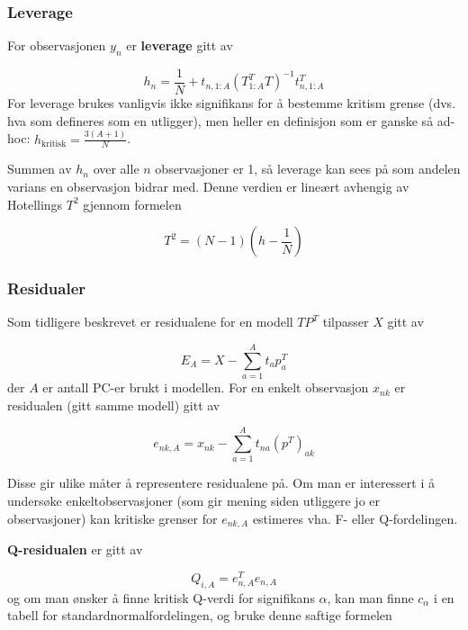 \subsubsection{Leverage}
For observasjonen $y_n$ er \textbf{leverage} gitt av

\begin{equation}
	h_n = \frac{1}{N} + t_{n, 1:A} (T_{1:A}^T T)^{-1} t_{n, 1:A}^T
\end{equation}
For leverage brukes vanligvis ikke signifikans for å bestemme kritism grense (dvs. hva som defineres som en utligger), men heller en definisjon som er ganske så ad-hoc: $h_{\textrm{kritisk}} = \frac{3(A+1)}{N}$.

Summen av $h_n$ over alle $n$ observasjoner er 1, så leverage kan sees på som andelen varians en observasjon bidrar med. Denne verdien er lineært avhengig av Hotellings $T^2$ gjennom formelen

\begin{equation}
	T^2 = (N-1) (h - \frac{1}{N})
\end{equation}

\subsubsection{Residualer}
Som tidligere beskrevet er residualene for en modell $T P^T$ tilpasser $X$ gitt av

\begin{equation}
	E_A = X - \sum_{a = 1}^A t_a p_a^T
\end{equation}
der $A$ er antall PC-er brukt i modellen. For en enkelt observasjon $x_{nk}$ er residualen (gitt samme modell) gitt av

\begin{equation}
	e_{nk, A} = x_{nk} - \sum_{a = 1}^A t_{na} (p^T)_{ak}
\end{equation}

Disse gir ulike måter å representere residualene på. Om man er interessert i å undersøke enkeltobservasjoner (som gir mening siden utliggere jo er observasjoner) kan kritiske grenser for $e_{nk, A}$ estimeres vha. F- eller Q-fordelingen. 

\textbf{Q-residualen} er gitt av

\begin{equation}
	Q_{i, A} = e_{n, A}^T e_{n, A}
\end{equation}
og om man ønsker å finne kritisk Q-verdi for signifikans $\alpha$, kan man finne $c_\alpha$ i en tabell for standardnormalfordelingen, og bruke denne saftige formelen

